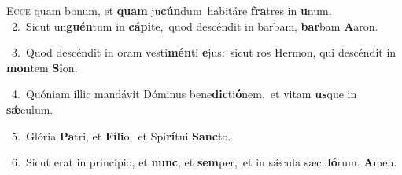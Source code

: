 \lettrine{\initial\textcolor{\initialcolor}{E}}{cce} quam bonum, et \textbf{quam} ju\-\textbf{cún}\-dum~\star habitáre \textbf{fra}\-tres in \textbf{u}\-num.\\
{\numbfont\textcolor{\numbcolor}{~2.}}~Sicut un\-\textbf{guén}\-tum in \textbf{cá}\-\textbf{pi}te,~\star quod descéndit in barbam, \textbf{bar}\-bam \textbf{A}\-aron.\par
{\numbfont\textcolor{\numbcolor}{~3.}}~Quod descéndit in oram vesti\-\textbf{mén}\-ti \textbf{e}\-jus:~\star sicut ros Hermon, qui descéndit in \textbf{mon}\-tem \textbf{Si}\-on.\par
{\numbfont\textcolor{\numbcolor}{~4.}}~Quóniam illic mandávit Dóminus bene\-\textbf{dic}\-ti\-\textbf{ó}\-nem,~\star et vitam \textbf{us}\-que in \textbf{sǽ}\-culum.\par
{\numbfont\textcolor{\numbcolor}{~5.}}~Glória \textbf{Pa}\-tri, et \textbf{Fí}\-\textbf{li}o,~\star et Spi\-\textbf{rí}\-tui \textbf{Sanc}\-to.\par
{\numbfont\textcolor{\numbcolor}{~6.}}~Sicut erat in princípio, et \textbf{nunc}\-, et \textbf{sem}\-per,~\star et in sǽcula sæcu\-\textbf{ló}\-rum. \textbf{A}\-men.\par
